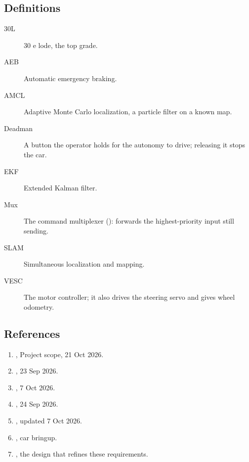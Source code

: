 \documentclass[11pt,a4paper]{article}
\begin{document}
\subsection{Definitions}
\begin{description}
  \item[30L] 30 e lode, the top grade.
  \item[AEB] Automatic emergency braking.
  \item[AMCL] Adaptive Monte Carlo localization, a particle filter on a known map.
  \item[Deadman] A button the operator holds for the autonomy to drive; releasing it stops the car.
  \item[EKF] Extended Kalman filter.
  \item[Mux] The command multiplexer (): forwards the highest-priority input still sending.
  \item[SLAM] Simultaneous localization and mapping.
  \item[VESC] The motor controller; it also drives the steering servo and gives wheel odometry.
\end{description}

\subsection{References}
\begin{enumerate}
  \item {}, Project scope, 21 Oct 2026.
  \item {}, 23 Sep 2026.
  \item {}, 7 Oct 2026.
  \item {}, 24 Sep 2026.
  \item {}, updated 7 Oct 2026.
  \item {}, car bringup.
  \item {}, the design that refines these requirements.
\end{enumerate}
\end{document}
